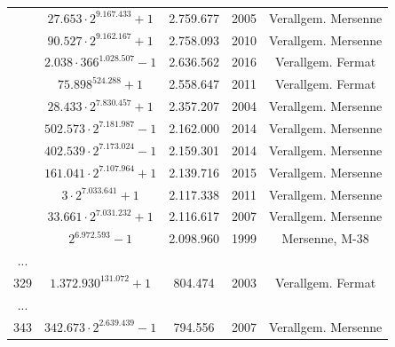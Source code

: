 \begin{refsegment}
\begin{table}[ht]
\begin{center}
\begin{tabular}{|c|cccc|}
	\rowno & $27.653 \cdot 2^{9.167.433}+1$ & 2.759.677 & 2005 & Verallgem. Mersenne \\%

	\rowno & $90.527 \cdot 2^{9.162.167}+1$ & 2.758.093 & 2010 & Verallgem. Mersenne \\
	\rowno & $2.038 \cdot 366^{1.028.507}-1$ & 2.636.562 & 2016 & Verallgem. Fermat \\
	\rowno & $75.898^{524.288}+1$ & 2.558.647 & 2011 & Verallgem. Fermat \\

	\rowno & $28.433 \cdot 2^{7.830.457}+1$ & 2.357.207 & 2004 & Verallgem. Mersenne \\%

	\rowno & $502.573 \cdot 2^{7.181.987}-1$ & 2.162.000 & 2014 & Verallgem. Mersenne \\
	\rowno & $402.539 \cdot 2^{7.173.024}-1$ & 2.159.301 & 2014 & Verallgem. Mersenne \\
	\rowno & $161.041 \cdot 2^{7.107.964}+1$ & 2.139.716 & 2015 & Verallgem. Mersenne \\
	\rowno & $3 \cdot 2^{7.033.641}+1$ & 2.117.338 & 2011 & Verallgem. Mersenne \\
	\rowno & $33.661 \cdot 2^{7.031.232}+1$ & 2.116.617 & 2007 & Verallgem. Mersenne \\

	\rowno & $2^{ 6.972.593}-1$ & 2.098.960 & 1999 & Mersenne, M-38 \\%
        ... &  &  &  & \\
	329 & $1.372.930^{131.072}+1$ &   804.474 & 2003 & Verallgem. Fermat\footnotemark \\
        ... &  &  &  & \\
	343 & $342.673 \cdot 2^{2.639.439}-1$ & 794.556 & 2007 & Verallgem. Mersenne \\


\end{tabular}
\end{center}
\end{table}
\end{refsegment}

